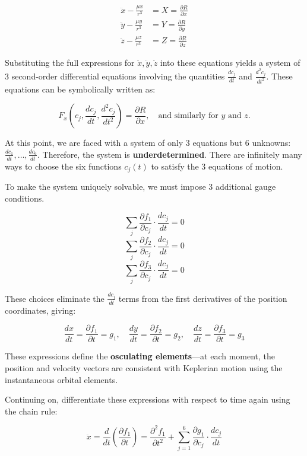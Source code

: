 \documentclass{article}
\begin{document}
\begin{align*}
\ddot{x} - \frac{\mu x}{r^3} &= X = \frac{\partial R}{\partial x} \\
\ddot{y} - \frac{\mu y}{r^3} &= Y = \frac{\partial R}{\partial y} \\
\ddot{z} - \frac{\mu z}{r^3} &= Z = \frac{\partial R}{\partial z}
\end{align*}

Substituting the full expressions for \( \ddot{x}, \ddot{y}, \ddot{z} \) into these equations yields a system of 3 second-order differential equations involving the quantities \( \frac{dc_j}{dt} \) and \( \frac{d^2c_j}{dt^2} \). These equations can be symbolically written as:

\[
F_x\left(c_j, \frac{dc_j}{dt}, \frac{d^2c_j}{dt^2}\right) = \frac{\partial R}{\partial x}, \quad \text{and similarly for } y \text{ and } z.
\]

At this point, we are faced with a system of only 3 equations but 6 unknowns: \( \frac{dc_1}{dt}, \dots, \frac{dc_6}{dt} \). Therefore, the system is \textbf{underdetermined}. There are infinitely many ways to choose the six functions \( c_j(t) \) to satisfy the 3 equations of motion.

To make the system uniquely solvable, we must impose 3 additional gauge conditions.

\[
\sum_j \frac{\partial f_1}{\partial c_j} \cdot \frac{dc_j}{dt} = 0
\]
\[
\sum_j \frac{\partial f_2}{\partial c_j} \cdot \frac{dc_j}{dt} = 0
\]
\[
\sum_j \frac{\partial f_3}{\partial c_j} \cdot \frac{dc_j}{dt} = 0
\]

These choices eliminate the \( \frac{dc_j}{dt} \) terms from the first derivatives of the position coordinates, giving:

\[
\frac{dx}{dt} = \frac{\partial f_1}{\partial t} = g_1, \quad
\frac{dy}{dt} = \frac{\partial f_2}{\partial t} = g_2, \quad
\frac{dz}{dt} = \frac{\partial f_3}{\partial t} = g_3
\]

These expressions define the \textbf{osculating elements}—at each moment, the position and velocity vectors are consistent with Keplerian motion using the instantaneous orbital elements.


Continuing on, differentiate these expressions with respect to time again using the chain rule:

\[
\ddot{x} = \frac{d}{dt} \left( \frac{\partial f_1}{\partial t} \right)
= \frac{\partial^2 f_1}{\partial t^2} + \sum_{j=1}^{6} \frac{\partial g_1}{\partial c_j} \cdot \frac{dc_j}{dt}
\]
\end{document}
